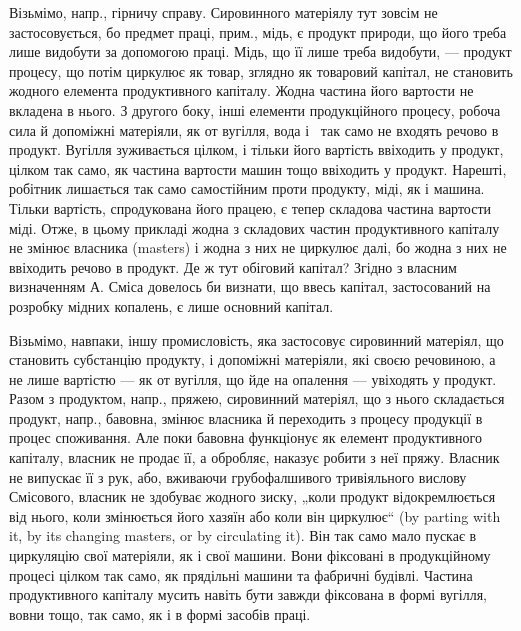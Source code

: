 Візьмімо, напр., гірничу справу. Сировинного матеріялу тут зовсім не
застосовується, бо предмет праці, прим., мідь, є продукт природи, що
його треба лише видобути за допомогою праці. Мідь, що її лише треба
видобути, — продукт процесу, що потім циркулює як товар, зглядно як
товаровий капітал, не становить жодного елемента продуктивного капіталу.
Жодна частина його вартости не вкладена в нього. З другого боку,
інші елементи продукційного процесу, робоча сила й допоміжні матеріяли,
як от вугілля, вода і~ так само не входять речово в продукт.
Вугілля зуживається цілком, і тільки його вартість ввіходить у продукт,
цілком так само, як частина вартости машин тощо ввіходить у продукт.
Нарешті, робітник лишається так само самостійним проти продукту, міді,
як і машина. Тільки вартість, спродукована його працею, є тепер складова
частина вартости міді. Отже, в цьому прикладі жодна з складових
частин продуктивного капіталу не змінює власника (masters) і жодна з
них не циркулює далі, бо жодна з них не ввіходить речово в продукт.
Де ж тут обіговий капітал? Згідно з власним визначенням А. Сміса довелось
би визнати, що ввесь капітал, застосований на розробку мідних
копалень, є лише основний капітал.

Візьмімо, навпаки, іншу промисловість, яка застосовує сировинний
матеріял, що становить субстанцію продукту, і допоміжні матеріяли, які
своєю речовиною, а не лише вартістю — як от вугілля, що йде на опалення
— увіходять у продукт. Разом з продуктом, напр., пряжею, сировинний
матеріял, що з нього складається продукт, напр., бавовна, змінює
власника й переходить з процесу продукції в процес споживання. Але
поки бавовна функціонує як елемент продуктивного капіталу, власник не
продає її, а обробляє, наказує робити з неї пряжу. Власник не випускає
її з рук, або, вживаючи грубофалшивого тривіяльного вислову Смісового,
власник не здобуває жодного зиску, „коли продукт відокремлюється від
нього, коли змінюється його хазяїн або коли він циркулює“ (by parting
with it, by its changing masters, or by circulating it). Він так само мало
пускає в циркуляцію свої матеріяли, як і свої машини. Вони фіксовані
в продукційному процесі цілком так само, як прядільні машини та фабричні
будівлі. Частина продуктивного капіталу мусить навіть бути завжди
фіксована в формі вугілля, вовни тощо, так само, як і в формі засобів
праці.


